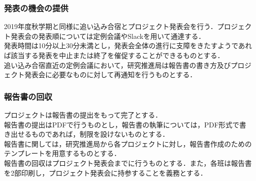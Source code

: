 \subsubsection*{発表の機会の提供}

2019年度秋学期と同様に追い込み合宿とプロジェクト発表会を行う．プロジェクト発表会の発表順については定例会議やSlackを用いて通達する．\\
発表時間は10分以上30分未満とし，発表会全体の進行に支障をきたすようであれば該当する発表を中止または終了を催促することができるものとする．\\
追い込み合宿直近の定例会議において，研究推進局は報告書の書き方及びプロジェクト発表会に必要なものに対して再通知を行うものとする．

\subsubsection*{報告書の回収}

プロジェクトは報告書の提出をもって完了とする．\\報告書の提出はPDFで行うものとし，報告書の執筆については，PDF形式で書き出せるものであれば，制限を設けないものとする．\\
報告書に関しては，研究推進局から各プロジェクトに対し，報告書作成のためのテンプレートを用意するものとする．\\
報告書の回収はプロジェクト発表会までに行うものとする．また，各班は報告書を2部印刷し，プロジェクト発表会に持参することを義務とする．\\

